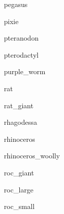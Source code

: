 \documentclass[letterpaper,serif]{module}
\begin{document}
\begin{newmonster}{pegasus}\end{newmonster}

\begin{newmonster}{pixie}\end{newmonster}

\begin{newmonster}{pteranodon}\end{newmonster}

\begin{newmonster}{pterodactyl}\end{newmonster}

\begin{newmonster}{purple_worm}\end{newmonster}

\begin{newmonster}{rat}\end{newmonster}

\begin{newmonster}{rat_giant}\end{newmonster}

\begin{newmonster}{rhagodessa}\end{newmonster}

\begin{newmonster}{rhinoceros}\end{newmonster}

\begin{newmonster}{rhinoceros_woolly}\end{newmonster}

\begin{newmonster}{roc_giant}\end{newmonster}

\begin{newmonster}{roc_large}\end{newmonster}

\begin{newmonster}{roc_small}\end{newmonster}
\end{document}
